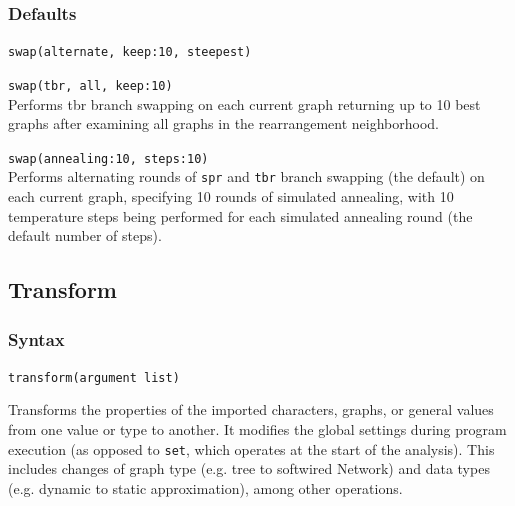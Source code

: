 		\subsubsection{Defaults}
			\texttt{swap(alternate, keep:10, steepest)}
		
		\begin{example}
			\item{\texttt{swap(tbr, all, keep:10)}\\Performs tbr branch swapping on each current graph 
			returning up to 10 best graphs after examining all graphs in 
			the rearrangement neighborhood.}
			
			\item{\texttt{swap(annealing:10, steps:10)}\\Performs alternating rounds of \texttt{spr} and 
			\texttt{tbr} branch swapping (the default) on each current graph, specifying 10 rounds of
			simulated annealing, with 10 temperature steps being performed for each
			simulated annealing round (the default number of steps).}
		\end{example}
	
\subsection{Transform}
\label{subsec:transform}
	\subsubsection{Syntax}
		\texttt{transform(argument list)}
			
	\begin{phygdescription}
		{Transforms the properties of the imported characters, graphs, or general values 
		from one value or type to another. It 
		modifies the global settings during program execution (as opposed to \texttt{set}, 
		which operates at the start of the analysis). This includes changes of graph type
		(e.g. tree to softwired Network) and data types (e.g. dynamic to static 
		approximation), among other operations.}
	\end{phygdescription}
			
